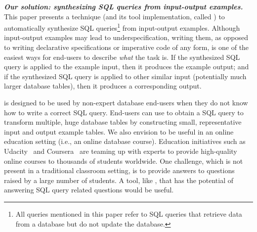 

\vspace{1mm}
\noindent \textbf{\textit{Our solution: synthesizing SQL queries from input-output examples.}}
This paper presents a technique (and its tool
implementation, called \ourtool) to automatically
synthesize SQL queries\footnote{
All queries mentioned in this paper refer to SQL queries
that retrieve data from a database but
do not update the database.}
from input-output examples.
Although input-output examples may lead to
underspecification, writing them, as opposed to writing
declarative specifications or imperative code
of any form, is one of the easiest ways
for end-users to describe \textit{what} the task is.
If the synthesized SQL query is applied
to the example input, then it produces the example output; and if the
synthesized SQL query is applied to other
similar input (potentially much larger database tables),
then it produces a corresponding output.




\ourtool is designed to be used by non-expert database
end-users when they do not know how
to write a correct SQL query. 
End-users can use \ourtool to obtain a SQL query to transform
multiple, huge database tables by constructing small, representative
input and output example tables. 
We also envision \ourtool to be useful in an online education
setting (i.e., an online database course). 
Education initiatives such as Udacity~\cite{udacity} and Coursera~\cite{coursera}
 are teaming up with experts to provide
high-quality online courses to thousands of students worldwide.
One challenge, which is not present in a traditional classroom
setting, is to provide answers to questions raised by a large
number of students. A tool, like \ourtool,
that has the potential of answering SQL query related questions
would be useful.


